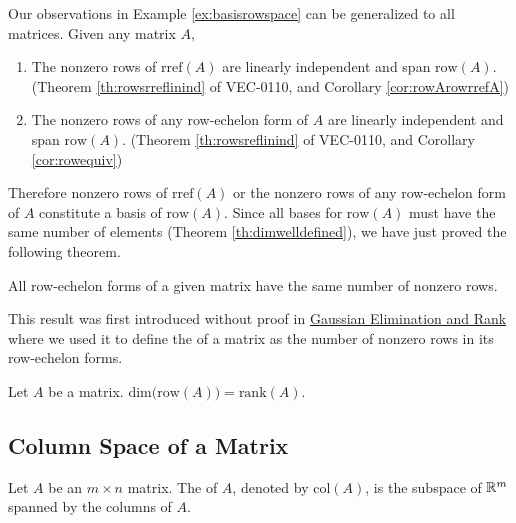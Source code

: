 \documentclass{ximera}
\begin{document}
Our observations in Example \ref{ex:basisrowspace} can be generalized to all matrices.  Given any matrix $A$,
\begin{enumerate}
    \item The nonzero rows of $\mbox{rref}(A)$ are linearly independent and span $\mbox{row}(A)$.  (Theorem \ref{th:rowsrreflinind} of VEC-0110, and Corollary \ref{cor:rowArowrrefA})
    \item The nonzero rows of any row-echelon form of $A$ are linearly independent and span $\mbox{row}(A)$.  (Theorem \ref{th:rowsreflinind} of VEC-0110, and Corollary \ref{cor:rowequiv})
\end{enumerate}
Therefore nonzero rows of $\mbox{rref}(A)$ or the nonzero rows of any row-echelon form of $A$ constitute a basis of $\mbox{row}(A)$.  Since all bases for $\mbox{row}(A)$ must have the same number of elements (Theorem \ref{th:dimwelldefined}), we have just proved the following theorem.

\begin{theorem}\label{th:samenumberofnonzerorows}
All row-echelon forms of a given matrix have the same number of nonzero rows.
\end{theorem}

This result was first introduced without proof in \href{https://ximera.osu.edu/oerlinalg/LinearAlgebra/SYS-0030/main}{Gaussian Elimination and Rank} where we used it to define the  of a matrix as the number of nonzero rows in its row-echelon forms.

\begin{theorem}\label{th:dimofrowA}
Let $A$ be a matrix.  
$\mbox{dim}\Big(\mbox{row}(A)\Big)=\mbox{rank}(A)$.
\end{theorem}


\subsection*{Column Space of a Matrix}
\begin{definition}\label{def:colspace} Let $A$ be an $m\times n$ matrix.  The  of $A$, denoted by $\mbox{col}(A)$, is the subspace of $\mathbb{R}^m$ spanned by the columns of $A$.
\end{definition}
\end{document}
